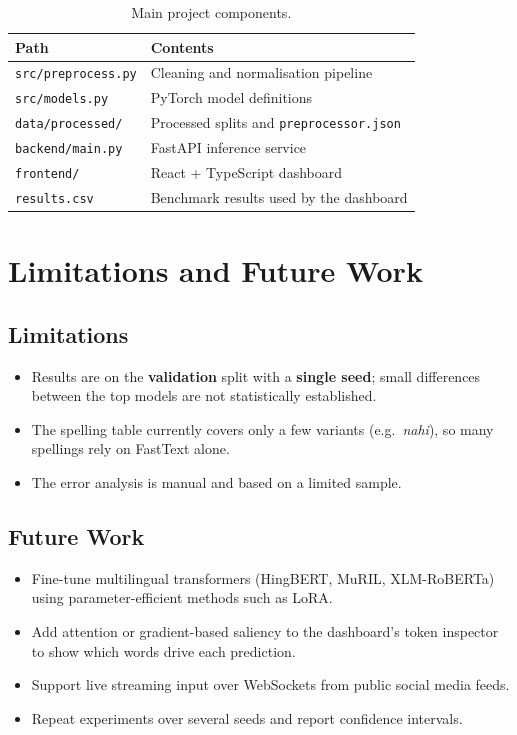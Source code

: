 \documentclass[11pt,a4paper]{article}
\begin{document}
\begin{table}[htbp]
\centering
\small
\begin{tabular}{ll}
\toprule
\textbf{Path} & \textbf{Contents} \\
\midrule
\texttt{src/preprocess.py} & Cleaning and normalisation pipeline \\
\texttt{src/models.py}     & PyTorch model definitions \\
\texttt{data/processed/}   & Processed splits and \texttt{preprocessor.json} \\
\texttt{backend/main.py}   & FastAPI inference service \\
\texttt{frontend/}         & React + TypeScript dashboard \\
\texttt{results.csv}       & Benchmark results used by the dashboard \\
\bottomrule
\end{tabular}
\caption{Main project components.}
\end{table}

\section{Limitations and Future Work}

\subsection{Limitations}
\begin{itemize}
    \item Results are on the \textbf{validation} split with a \textbf{single seed}; small differences between the top models are not statistically established.
    \item The spelling table currently covers only a few variants (e.g.\ \textit{nahi}), so many spellings rely on FastText alone.
    \item The error analysis is manual and based on a limited sample.
\end{itemize}

\subsection{Future Work}
\begin{itemize}
    \item Fine-tune multilingual transformers (HingBERT, MuRIL, XLM-RoBERTa) using parameter-efficient methods such as LoRA.
    \item Add attention or gradient-based saliency to the dashboard's token inspector to show which words drive each prediction.
    \item Support live streaming input over WebSockets from public social media feeds.
    \item Repeat experiments over several seeds and report confidence intervals.
\end{itemize}
\end{document}
